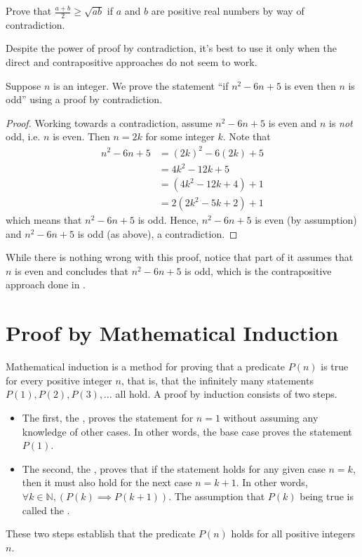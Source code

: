 \begin{exercise}
    Prove that $\frac{a+b}{2} \geq \sqrt{ab}$ if $a$ and $b$ are positive real numbers by way of contradiction.
\end{exercise}

Despite the power of proof by contradiction, it's best to use it only when the direct and contrapositive approaches do not seem to work.
\begin{example}
    Suppose $n$ is an integer. We prove the statement ``if $n^2 - 6n + 5$ is even then $n$ is odd'' using a proof by contradiction.
    \begin{proof}
        Working towards a contradiction, assume $n^2 - 6n + 5$ is even and $n$ is \textit{not} odd, i.e. $n$ is even. Then $n = 2k$ for some integer $k$. Note that
        \begin{align*}
            n^2 - 6n + 5 &= (2k)^2 - 6(2k) + 5\\
            &= 4k^2 - 12k + 5\\
            &= (4k^2 - 12k + 4) + 1\\
            &= 2(2k^2 - 5k + 2) + 1
        \end{align*}
        which means that $n^2 - 6n + 5$ is odd. Hence, $n^2 - 6n + 5$ is even (by assumption) and $n^2 - 6n + 5$ is odd (as above), a contradiction.
    \end{proof}
    While there is nothing wrong with this proof, notice that part of it assumes that $n$ is even and concludes that  $n^2 - 6n + 5$ is odd, which is the contrapositive approach done in .
\end{example}

\section{Proof by Mathematical Induction}
Mathematical induction is a method for proving that a predicate $P(n)$ is true for every positive integer $n$, that is, that the infinitely many statements $P(1), P(2), P(3), \dots$ all hold. A proof by induction consists of two steps.
\begin{itemize}
    \item The first, the , proves the statement for $n = 1$ without assuming any knowledge of other cases. In other words, the base case proves the statement $P(1)$.
    \item The second, the , proves that if the statement holds for any given case $n = k$, then it must also hold for the next case $n = k + 1$. In other words, $\forall k \in \mathbb{N}, (P(k) \implies P(k+1))$. The assumption that $P(k)$ being true is called the .
\end{itemize}
These two steps establish that the predicate $P(n)$ holds for all positive integers $n$.

